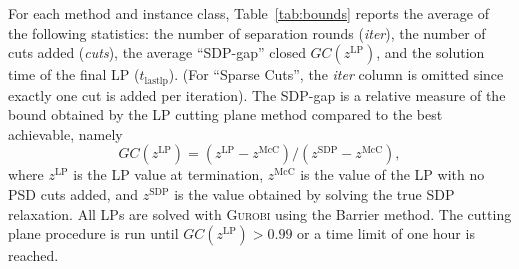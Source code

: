 \documentclass[twoside]{article}
\newcommand{\jj}[1]{{\textcolor{blue}{#1}}}
\newcommand{\red}[1]{{\textcolor{red}{#1}}}
\newcommand{\pj}[1]{{ \red{[PJ: #1]}}}
\begin{document}
		
		For each method and instance class, Table~\ref{tab:bounds} reports the average of the following statistics: the number of separation rounds (\textit{iter}), the number of cuts added (\textit{cuts}), the average ``SDP-gap'' closed $GC(z^{\text{LP}})$, and the solution time of the final LP ($t_{\text{lastlp}}$).  (For ``Sparse Cuts'', the \textit{iter} column is omitted since exactly one cut is added per iteration).
		The SDP-gap is a relative measure of the bound obtained by the LP cutting plane method compared to the best achievable, namely
		\[ GC(z^{\text{LP}}) = (z^{\text{LP}} - z^{\text{McC}})/(z^{\text{SDP}} - z^{\text{McC}}), \]
		where $z^{\text{LP}}$ is the LP value at termination, $z^{\text{McC}}$ is the value of the LP with no PSD cuts added, and $z^{\text{SDP}}$ is the value obtained by solving the true SDP relaxation.
		All LPs are solved with \textsc{Gurobi} using the Barrier method.
		The cutting plane procedure is run until $GC(z^{\text{LP}}) > 0.99$ or a time limit of one hour is reached. 
		
		
		
\end{document}
